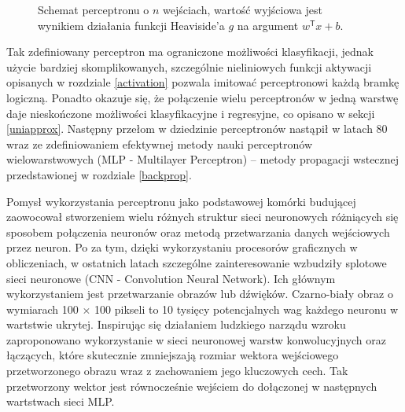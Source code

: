 \documentclass[11pt]{book}
\theoremstyle{definition}
\begin{document}
\begin{SCfigure}
	\centering
	\caption{Schemat perceptronu o $n$ wejściach, wartość wyjściowa jest wynikiem działania funkcji Heaviside'a $g$ na argument $w^\mathsf{T}x + b$.}
\end{SCfigure}
%


Tak zdefiniowany perceptron ma ograniczone możliwości klasyfikacji, jednak użycie bardziej skomplikowanych, szczególnie nieliniowych funkcji aktywacji opisanych w rozdziale \ref{activation} pozwala imitować perceptronowi każdą bramkę logiczną. Ponadto okazuje się, że połączenie wielu perceptronów w jedną warstwę daje nieskończone możliwości klasyfikacyjne i regresyjne, co opisano w sekcji \ref{uniapprox}. Następny przełom w dziedzinie perceptronów nastąpił  w latach 80 wraz ze zdefiniowaniem efektywnej metody nauki perceptronów wielowarstwowych (MLP - Multilayer Perceptron) -- metody propagacji wstecznej przedstawionej w rozdziale \ref{backprop}. 

Pomysł wykorzystania perceptronu jako podstawowej komórki budującej zaowocował stworzeniem wielu różnych struktur sieci neuronowych różniących się sposobem połączenia neuronów oraz metodą przetwarzania danych wejściowych przez neuron. Po za tym, dzięki wykorzystaniu procesorów graficznych w obliczeniach, w ostatnich latach szczególne zainteresowanie wzbudziły splotowe sieci neuronowe (CNN - Convolution Neural Network). Ich głównym wykorzystaniem jest przetwarzanie obrazów lub dźwięków. Czarno-biały obraz o wymiarach 100 $\times$ 100 pikseli to 10 tysięcy potencjalnych wag każdego neuronu w wartstwie ukrytej. Inspirując się działaniem ludzkiego narządu wzroku zaproponowano \cite{Lecun98gradient-basedlearning} wykorzystanie w sieci neuronowej warstw konwolucyjnych oraz łączących, które skutecznie zmniejszają rozmiar wektora wejściowego przetworzonego obrazu wraz z zachowaniem jego kluczowych cech. Tak przetworzony wektor jest równocześnie wejściem do dołączonej w następnych wartstwach sieci MLP. 
\end{document}
